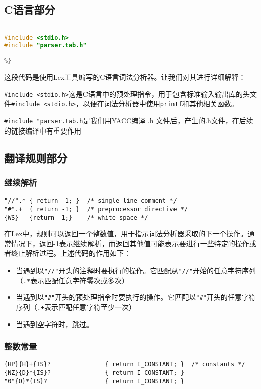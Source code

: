 \documentclass[lang=cn,11pt,a4paper]{elegantpaper}
\begin{document}
\subsection{C语言部分}
\begin{lstlisting}[language=C]
%{

#include <stdio.h>
#include "parser.tab.h"

%}
\end{lstlisting}


这段代码是使用Lex工具编写的C语言词法分析器。让我们对其进行详细解释：


\lstinline{#include <stdio.h>}这是C语言中的预处理指令，用于包含标准输入输出库的头文件\lstinline{#include <stdio.h>}，以便在词法分析器中使用\lstinline{printf}和其他相关函数。

\lstinline{#include "parser.tab.h}是我们用YACC编译 .h 文件后，产生的.h文件，在后续的链接编译中有重要作用


\subsection{翻译规则部分}

\subsubsection{继续解析}
\begin{lstlisting}
"//".* { return -1; }  /* single-line comment */
"#".+  { return -1; }  /* preprocessor directive */
{WS}   {return -1;}    /* white space */
\end{lstlisting}

在Lex中，规则可以返回一个整数值，用于指示词法分析器采取的下一个操作。通常情况下，返回-1表示继续解析，而返回其他值可能表示要进行一些特定的操作或者终止解析过程。上述代码的作用如下：
\begin{itemize}
    \item 当遇到以\lstinline{"//"}开头的注释时要执行的操作。它匹配从\lstinline{"//"}开始的任意字符序列（\lstinline{.*}表示匹配任意字符零次或多次）
    \item 当遇到以\lstinline{"#"}开头的预处理指令时要执行的操作。它匹配以\lstinline{"#"}开头的任意字符序列（\lstinline{.+}表示匹配任意字符至少一次）
    \item 当遇到空字符时，跳过。
\end{itemize}

\subsubsection{整数常量}
\begin{lstlisting}
{HP}{H}+{IS}?			    { return I_CONSTANT; }  /* constants */
{NZ}{D}*{IS}?			    { return I_CONSTANT; }
"0"{O}*{IS}?		    	{ return I_CONSTANT; }
\end{lstlisting}
\end{document}
